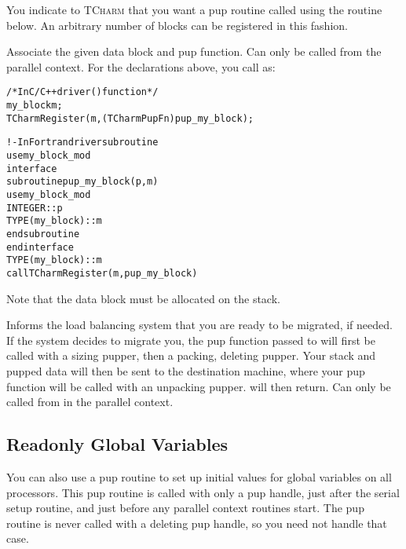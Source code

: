 \documentclass[10pt]{article}
\newcommand{\tcharm}{\textsc{TCharm}}
\begin{document}
You indicate to \tcharm{} that you want a pup routine called using
the routine below.  An arbitrary number of blocks can be registered
in this fashion.

\vspace{0.2in}

     Associate the given data block and pup function.  Can only be
     called from the parallel context.  For the declarations above, you call
      as:

\begin{alltt}
          /*In C/C++ driver() function*/
          my_block m;
          TCharmRegister(m,(TCharmPupFn)pup_my_block);
 
          !- In Fortran driver subroutine
          use my_block_mod
          interface
            subroutine pup_my_block(p,m)
              use my_block_mod
              INTEGER :: p
              TYPE(my_block) :: m
            end subroutine
          end interface
          TYPE(my_block) :: m
          call TCharmRegister(m,pup_my_block)
\end{alltt}

     Note that the data block must be allocated on the stack.

\vspace{0.2in}

     Informs the load balancing system that you are ready to be
     migrated, if needed.  If the system decides to migrate you, the
     pup function passed to  will first be called with 
     a sizing pupper, then a packing, deleting pupper.  Your stack and pupped
     data will then be sent to the destination machine, where your pup
     function will be called with an unpacking pupper.  
     will then return.  Can only be called from in the parallel context.



\subsection{Readonly Global Variables}
\label{sec:readonlyglobal}

You can also use a pup routine to set up initial values for global
variables on all processors.  This pup routine is called with only
a pup handle, just after the serial setup routine, and just before 
any parallel context routines start.  The pup routine is never
called with a deleting pup handle, so you need not handle that case.
\end{document}
